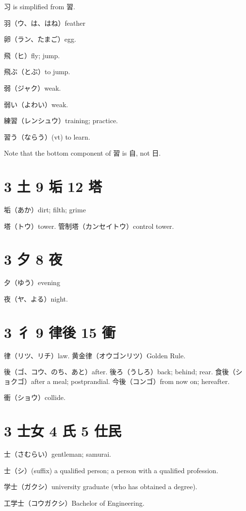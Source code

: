 习 is simplified from 習.

羽（ウ、は、はね）feather

卵（ラン、たまご）egg.

飛（ヒ）fly; jump.

飛ぶ（とぶ）to jump.

弱（ジャク）weak.

弱い（よわい）weak.

練習（レンシュウ）training; practice.

習う（ならう）(vt) to learn.

Note that the bottom component of 習 is 自, not 日.

\section{3 土 9 垢 12 塔}

垢（あか）dirt; filth; grime

塔（トウ）tower.
管制塔（カンセイトウ）control tower.

\section{3 夕 8 夜}

夕（ゆう）evening

夜（ヤ、よる）night.

\section{3 彳 9 律後 15 衝}

律（リツ、リチ）law.
黄金律（オウゴンリツ）Golden Rule.

後（ゴ、コウ、のち、あと）after.
後ろ（うしろ）back; behind; rear.
食後（ショクゴ）after a meal; postprandial.
今後（コンゴ）from now on; hereafter.

衝（ショウ）collide.

\section{3 士女 4 氏 5 仕民}

士（さむらい）gentleman; samurai.

士（シ）(suffix)
a qualified person;
a person with a qualified profession.

学士（ガクシ）university graduate (who has obtained a degree).

工学士（コウガクシ）Bachelor of Engineering.

